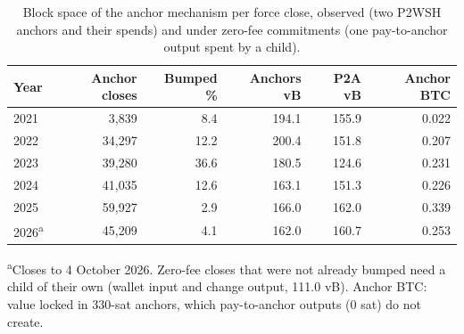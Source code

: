 \begin{table}[t]
\centering
\caption{Block space of the anchor mechanism per force close, observed (two P2WSH anchors and their spends) and under zero-fee commitments (one pay-to-anchor output spent by a child).}
\label{tab:zero_fee}
\footnotesize
\begin{tabular}{lrrrrr}
\toprule
Year & Anchor closes & Bumped \% & Anchors vB & P2A vB & Anchor BTC \\
\midrule
2021 & 3{,}839 & 8.4 & 194.1 & 155.9 & 0.022 \\
2022 & 34{,}297 & 12.2 & 200.4 & 151.8 & 0.207 \\
2023 & 39{,}280 & 36.6 & 180.5 & 124.6 & 0.231 \\
2024 & 41{,}035 & 12.6 & 163.1 & 151.3 & 0.226 \\
2025 & 59{,}927 & 2.9 & 166.0 & 162.0 & 0.339 \\
2026\textsuperscript{a} & 45{,}209 & 4.1 & 162.0 & 160.7 & 0.253 \\
\bottomrule
\end{tabular}
\par\smallskip\parbox{\linewidth}{\scriptsize \textsuperscript{a}Closes to 4 October 2026. Zero-fee closes that were not already bumped need a child of their own (wallet input and change output, 111.0 vB). Anchor BTC: value locked in 330-sat anchors, which pay-to-anchor outputs (0 sat) do not create.}
\end{table}
